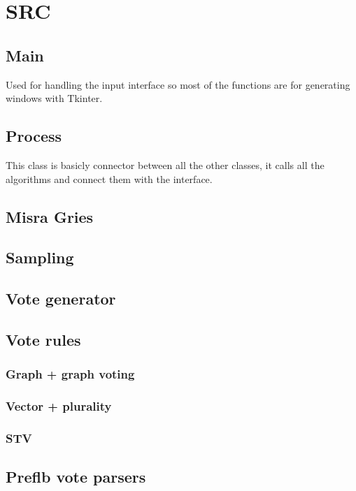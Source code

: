 \documentclass[a4paper,12pt]{report}
\begin{document}
	\chapter{SRC}
	
	\section{Main}
	
	Used for handling the input interface so most of the functions are for generating windows with Tkinter.
	
	\section{Process}
	
	This class is basicly connector between all the other classes, it calls all the algorithms and connect them with the interface.
	
	\section{Misra Gries}
	
	\section{Sampling}
	
	\section{Vote generator}
	
	\section{Vote rules}
	
	\subsection{Graph + graph voting}
	
	\subsection{Vector + plurality}
	
	\subsection{STV}
	
	\section{Preflb vote parsers}
	
\end{document}
